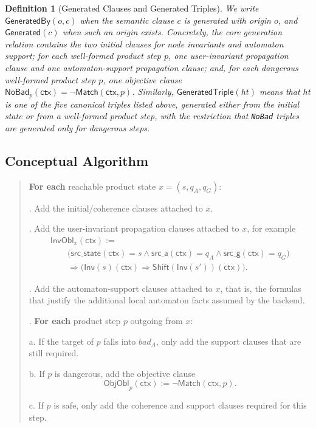 \documentclass[11pt,a4paper]{article}
\newtheorem{definition}{Definition}[section]
\newcommand{\UserInv}{\mathsf{Inv}}
\newcommand{\Match}{\mathsf{Match}}
\newcommand{\GeneratedBy}{\mathsf{GeneratedBy}}
\newcommand{\Generated}{\mathsf{Generated}}
\newcommand{\GeneratedTriple}{\mathsf{GeneratedTriple}}
\newcommand{\ctx}{\mathsf{ctx}}
\begin{document}
\begin{definition}[Generated Clauses and Generated Triples]
We write \(\GeneratedBy(o,c)\) when the semantic clause \(c\) is generated with
origin \(o\), and \(\Generated(c)\) when such an origin exists. Concretely, the
core generation relation contains the two initial clauses for node invariants
and automaton support; for each well-formed product step \(p\), one
user-invariant propagation clause and one automaton-support propagation clause;
and, for each dangerous well-formed product step \(p\), one objective clause
\(\mathsf{NoBad}_p(\ctx)=\neg \Match(\ctx,p)\).
Similarly, \(\GeneratedTriple(ht)\) means that \(ht\) is one of the five
canonical triples listed above, generated either from the initial state or from
a well-formed product step, with the restriction that \texttt{NoBad} triples
are generated only for dangerous steps.
\end{definition}

\subsection{Conceptual Algorithm}

\begin{quote}
\textbf{For each} reachable product state \(x=(s,q_A,q_G)\):

. Add the initial/coherence clauses attached to \(x\).

. Add the user-invariant propagation clauses attached to \(x\), for example
\[
\begin{array}{l}
\mathsf{InvObl}_x(\ctx) := {}\\
\qquad \bigl(\mathsf{src\_state}(\ctx)=s \land \mathsf{src\_a}(\ctx)=q_A
\land \mathsf{src\_g}(\ctx)=q_G\bigr)\\
\qquad\Rightarrow
\bigl(\UserInv(s)(\ctx)\Rightarrow \mathsf{Shift}(\UserInv(s'))(\ctx)\bigr).
\end{array}
\]

. Add the automaton-support clauses attached to
\quad \;\;\; \(x\), that is, the formulas that justify the additional local
\quad \;\;\; automaton facts assumed by the backend.

. \textbf{For each} product step \(p\) outgoing from \(x\):

\qquad a. If the target of \(p\) falls into \(bad_A\), only add the support
\qquad\;\;\; clauses that are still required.

\qquad b. If \(p\) is dangerous, add the objective clause
\[
\mathsf{ObjObl}_p(\ctx) := \neg \Match(\ctx,p).
\]

\qquad c. If \(p\) is safe, only add the coherence and support clauses
\qquad\;\;\; required for this step.
\end{quote}
\end{document}
